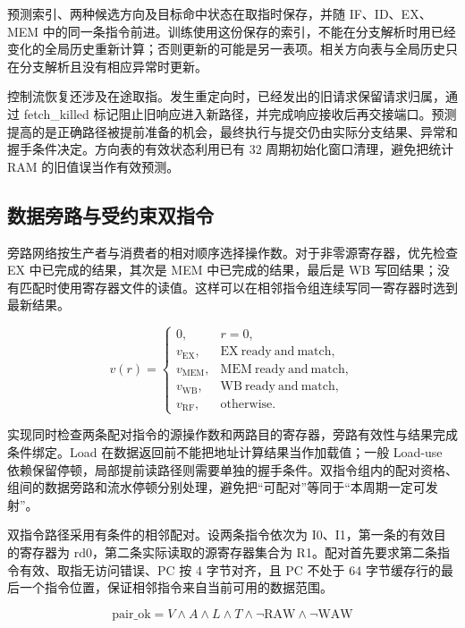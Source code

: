 \documentclass[UTF8,a4paper,12pt]{ctexart}
\begin{document}
预测索引、两种候选方向及目标命中状态在取指时保存，并随 IF、ID、EX、MEM 中的同一条指令前进。训练使用这份保存的索引，不能在分支解析时用已经变化的全局历史重新计算；否则更新的可能是另一表项。相关方向表与全局历史只在分支解析且没有相应异常时更新。\par

控制流恢复还涉及在途取指。发生重定向时，已经发出的旧请求保留请求归属，通过 fetch\_killed 标记阻止旧响应进入新路径，并完成响应接收后再交接端口。预测提高的是正确路径被提前准备的机会，最终执行与提交仍由实际分支结果、异常和握手条件决定。方向表的有效状态利用已有 32 周期初始化窗口清理，避免把统计 RAM 的旧值误当作有效预测。\par

\subsection{数据旁路与受约束双指令}

旁路网络按生产者与消费者的相对顺序选择操作数。对于非零源寄存器，优先检查 EX 中已完成的结果，其次是 MEM 中已完成的结果，最后是 WB 写回结果；没有匹配时使用寄存器文件的读值。这样可以在相邻指令组连续写同一寄存器时选到最新结果。\par

\[
v(r)=\begin{cases}0,&r=0,\\v_{\mathrm{EX}},&\mathrm{EX\ ready\ and\ match},\\v_{\mathrm{MEM}},&\mathrm{MEM\ ready\ and\ match},\\v_{\mathrm{WB}},&\mathrm{WB\ ready\ and\ match},\\v_{\mathrm{RF}},&\mathrm{otherwise}.\end{cases}
\]

实现同时检查两条配对指令的源操作数和两路目的寄存器，旁路有效性与结果完成条件绑定。Load 在数据返回前不能把地址计算结果当作加载值；一般 Load-use 依赖保留停顿，局部提前读路径则需要单独的握手条件。双指令组内的配对资格、组间的数据旁路和流水停顿分别处理，避免把“可配对”等同于“本周期一定可发射”。\par

双指令路径采用有条件的相邻配对。设两条指令依次为 I0、I1，第一条的有效目的寄存器为 rd0，第二条实际读取的源寄存器集合为 R1。配对首先要求第二条指令有效、取指无访问错误、PC 按 4 字节对齐，且 PC 不处于 64 字节缓存行的最后一个指令位置，保证相邻指令来自当前可用的数据范围。\par

\[
\mathrm{pair\_ok}=V\land A\land L\land T\land\neg\mathrm{RAW}\land\neg\mathrm{WAW}
\]
\end{document}
